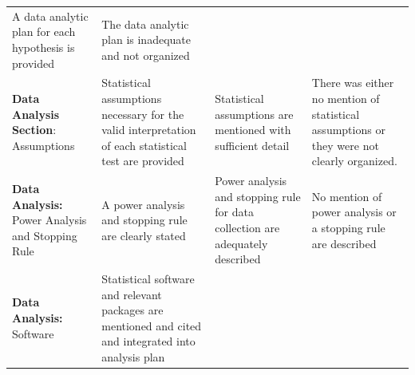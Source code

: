 \documentclass[
  openany]{book}
\begin{document}
\begin{longtable}[]{@{}llll@{}}
\begin{minipage}[t]{0.22\columnwidth}
A data analytic plan for each hypothesis is provided\strut
\end{minipage} & \begin{minipage}[t]{0.22\columnwidth}\raggedright
The data analytic plan is inadequate and not organized\strut
\end{minipage}\tabularnewline
\begin{minipage}[t]{0.22\columnwidth}\raggedright
\textbf{Data Analysis Section}: Assumptions\strut
\end{minipage} & \begin{minipage}[t]{0.22\columnwidth}\raggedright
Statistical assumptions necessary for the valid interpretation of each statistical test are provided\strut
\end{minipage} & \begin{minipage}[t]{0.22\columnwidth}\raggedright
Statistical assumptions are mentioned with sufficient detail\strut
\end{minipage} & \begin{minipage}[t]{0.22\columnwidth}\raggedright
There was either no mention of statistical assumptions or they were not clearly organized.\strut
\end{minipage}\tabularnewline
\begin{minipage}[t]{0.22\columnwidth}\raggedright
\textbf{Data Analysis:} Power Analysis and Stopping Rule\strut
\end{minipage} & \begin{minipage}[t]{0.22\columnwidth}\raggedright
A power analysis and stopping rule are clearly stated\strut
\end{minipage} & \begin{minipage}[t]{0.22\columnwidth}\raggedright
Power analysis and stopping rule for data collection are adequately described\strut
\end{minipage} & \begin{minipage}[t]{0.22\columnwidth}\raggedright
No mention of power analysis or a stopping rule are described\strut
\end{minipage}\tabularnewline
\begin{minipage}[t]{0.22\columnwidth}\raggedright
\textbf{Data Analysis:} Software\strut
\end{minipage} & \begin{minipage}[t]{0.22\columnwidth}\raggedright
Statistical software and relevant packages are mentioned and cited and integrated into analysis plan\strut
\end{minipage} & \begin{minipage}[t]{0.22\columnwidth}\raggedright

\end{minipage}
\end{longtable}
\end{document}
